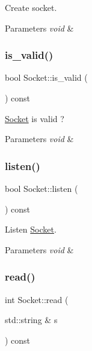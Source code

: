 Create socket. 


\begin{DoxyParams}{Parameters}
{\em void} & \\
\hline
\end{DoxyParams}
\mbox{\label{class_socket_aa1bf03020dfad0037edc66f8833f106b}} 
\subsubsection{\texorpdfstring{is\+\_\+valid()}{is\_valid()}}
{\footnotesize\ttfamily bool Socket\+::is\+\_\+valid (\begin{DoxyParamCaption}{ }\end{DoxyParamCaption}) const}



\hyperlink{class_socket}{Socket} is valid ? 


\begin{DoxyParams}{Parameters}
{\em void} & \\
\hline
\end{DoxyParams}
\mbox{\label{class_socket_a4cafff80a6e9116615c663b58032e4c8}} 
\subsubsection{\texorpdfstring{listen()}{listen()}}
{\footnotesize\ttfamily bool Socket\+::listen (\begin{DoxyParamCaption}{ }\end{DoxyParamCaption}) const}



Listen \hyperlink{class_socket}{Socket}. 


\begin{DoxyParams}{Parameters}
{\em void} & \\
\hline
\end{DoxyParams}
\mbox{\label{class_socket_a6e655e03426daad8ab34489ccf1860ff}} 
\subsubsection{\texorpdfstring{read()}{read()}}
{\footnotesize\ttfamily int Socket\+::read (\begin{DoxyParamCaption}\item[{std\+::string \&}]{s }\end{DoxyParamCaption}) const}



